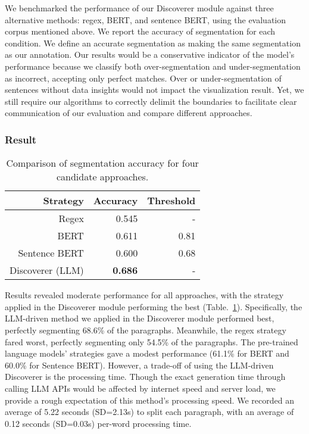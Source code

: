We benchmarked the performance of our Discoverer module against three alternative methods: regex, BERT, and sentence BERT, using the evaluation corpus mentioned above. %
We report the accuracy of segmentation for each condition. We define an accurate segmentation as making the same segmentation as our annotation. Our results would be a conservative indicator of the model's performance because we classify both over-segmentation and under-segmentation as incorrect, accepting only perfect matches. Over or under-segmentation of sentences without data insights would not impact the visualization result. Yet, we still require our algorithms to correctly delimit the boundaries to facilitate clear communication of our evaluation and compare different approaches.

\subsubsection{Result}
\begin{table}[tbp]
    \centering
    \caption{Comparison of segmentation accuracy for four candidate approaches.}
    \begin{tabular}{rrr}
    \toprule
       \textbf{Strategy}  & \textbf{Accuracy} & \textbf{Threshold} \\
    \midrule
       Regex  & 0.545 & - \\ 
       BERT &  0.611 & 0.81\\ 
       Sentence BERT & 0.600 & 0.68 \\ 
       Discoverer (LLM)  & \textbf{0.686} & - \\ 
    \bottomrule
    \end{tabular}
    \label{tab:discoverer-eval}
\end{table}

Results revealed moderate performance for all approaches, with the strategy applied in the Discoverer module performing the best (Table.~\ref{tab:discoverer-eval}). Specifically, the LLM-driven method we applied in the Discoverer module performed best, perfectly segmenting 68.6\% of the paragraphs. Meanwhile, the regex strategy fared worst, perfectly segmenting only 54.5\% of the paragraphs. The pre-trained language models' strategies gave a modest performance (61.1\% for BERT and 60.0\% for Sentence BERT). However, a trade-off of using the LLM-driven Discoverer is the processing time. Though the exact generation time through calling LLM APIs would be affected by internet speed and server load, we provide a rough expectation of this method's processing speed. We recorded an average of 5.22 seconds (SD=2.13s) to split each paragraph, with an average of 0.12 seconds (SD=0.03s) per-word processing time.



